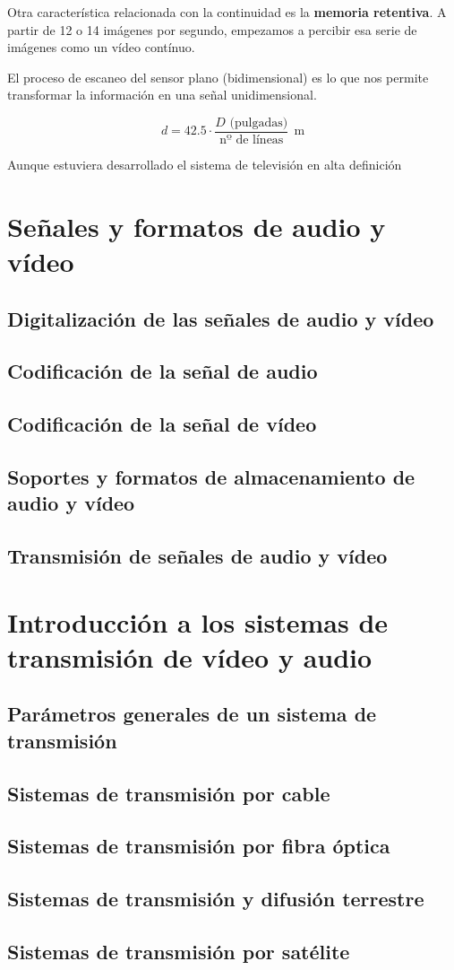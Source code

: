 \documentclass[10pt]{book}
\begin{document}
Otra característica relacionada con la continuidad es la \textbf{memoria retentiva}. A partir de 12 o 14 imágenes por segundo, empezamos a percibir esa serie de imágenes como un vídeo contínuo.

El proceso de escaneo del sensor plano (bidimensional) es lo que nos permite transformar la información en una señal unidimensional.

\[ d = 42.5 \cdot \frac{D \text{ (pulgadas)}}{\text{nº de líneas}} \ \SI{}{\metre} \]

Aunque estuviera desarrollado el sistema de televisión en alta definición


\chapter{Señales y formatos de audio y vídeo}

\section{Digitalización de las señales de audio y vídeo}

\section{Codificación de la señal de audio}

\section{Codificación de la señal de vídeo}

\section{Soportes y formatos de almacenamiento de audio y vídeo}

\section{Transmisión de señales de audio y vídeo}



\chapter{Introducción a los sistemas de transmisión de vídeo y audio}

\section{Parámetros generales de un sistema de transmisión}

\section{Sistemas de transmisión por cable}

\section{Sistemas de transmisión por fibra óptica}

\section{Sistemas de transmisión y difusión terrestre}

\section{Sistemas de transmisión por satélite}
\end{document}
